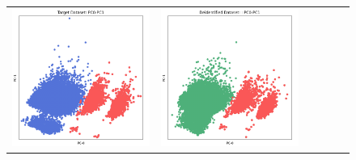 \begin{figure}[p!]
\begin{tabular}{@{} M{0.166\textwidth} M{0.166\textwidth} | M{0.166\textwidth} M{0.166\textwidth} | M{0.166\textwidth} M{0.166\textwidth} @{}}
       \includegraphics[width=\linewidth]{z_SynDiffix.orig.png} &
       \includegraphics[width=\linewidth]{z_SynDiffix.syn.png} \\ 

\end{tabular}
\end{figure}
